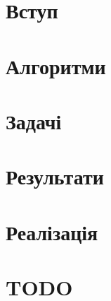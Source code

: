 \documentclass[a4paper,14pt,openany,oneside,oldfontcommands]{memoir}
\begin{document}
 
\newpage

\setcounter{page}{2}


\newpage

\tableofcontents*
\newpage

\chapter{Вступ}


\chapter{Алгоритми}


\chapter{Задачі}


\chapter{Результати}


\chapter{Реалізація}


\chapter{TODO}

\end{document}
